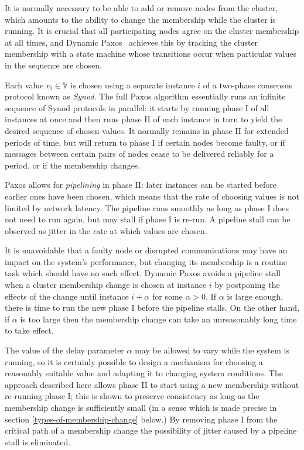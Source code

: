 \documentclass[journal]{IEEEtran}
\begin{document}
It is normally necessary to be able to add or remove nodes from the cluster,
which amounts to the ability to change the membership while the cluster is
running. It is crucial that all participating nodes agree on the cluster
membership at all times, and Dynamic Paxos~\cite{cheap-paxos} achieves this by
tracking the cluster membership with a state machine whose transitions occur
when particular values in the sequence are chosen.

Each value $v_i \in \mathbb V$ is chosen using a separate instance $i$ of a
two-phase consensus protocol known as \textit{Synod}. The full Paxos algorithm
essentially runs an infinite sequence of Synod protocols in parallel: it starts
by running phase I of all instances at once and then runs phase II of each
instance in turn to yield the desired sequence of chosen values. It normally
remains in phase II for extended periods of time, but will return to phase I if
certain nodes become faulty, or if messages between certain pairs of nodes
cease to be delivered reliably for a period, or if the membership changes.

Paxos allows for \textit{pipelining} in phase II: later instances can be
started before earlier ones have been chosen, which means that the rate of
choosing values is not limited by network latency. The pipeline runs smoothly
as long as phase I does not need to run again, but may stall if phase I is
re-run. A pipeline stall can be observed as jitter in the rate at which values
are chosen.

It is unavoidable that a faulty node or disrupted communications may have an
impact on the system's performance, but changing its membership is a routine
task which should have no such effect. Dynamic Paxos avoids a pipeline stall
when a cluster membership change is chosen at instance $i$ by postponing the
effects of the change until instance $i + \alpha$ for some $\alpha > 0$. If
$\alpha$ is large enough, there is time to run the new phase I before the
pipeline stalls.  On the other hand, if $\alpha$ is too large then the
membership change can take an unreasonably long time to take effect.

The value of the delay parameter $\alpha$ may be allowed to vary while the
system is running, so it is certainly possible to design a mechanism for
choosing a reasonably suitable value and adapting it to changing system
conditions. The approach described here allows phase II to start using a new
membership without re-running phase I; this is shown to preserve consistency as
long as the membership change is sufficiently small (in a sense which is made
precise in section \ref{types-of-membership-change} below.) By removing phase I
from the critical path of a membership change the possibility of jitter caused
by a pipeline stall is eliminated.
\end{document}
